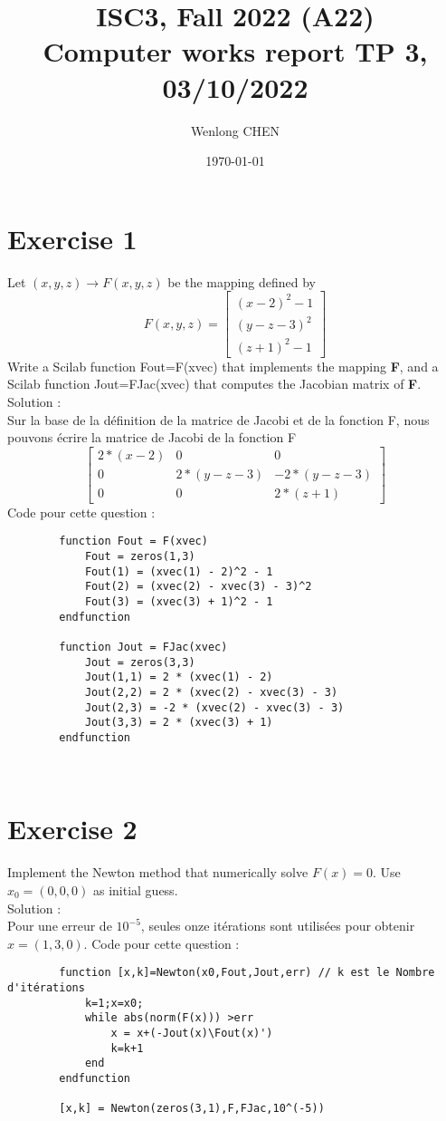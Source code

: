\documentclass[11pt]{article}
\title{ISC3, Fall 2022 (A22) \\
 Computer works report TP 3, 03/10/2022}
\author{Wenlong CHEN}
\date{\today}
\begin{document}
    \maketitle
    \section*{Exercise 1}
    Let $(x,y,z) \rightarrow F(x,y,z)$ be the mapping defined by
    $$
    F(x,y,z)=
    \begin{bmatrix}
        (x-2)^2-1 \\
        (y-z-3)^2 \\
        (z+1)^2-1
    \end{bmatrix}
    $$
    Write a Scilab function Fout=F(xvec) that implements the mapping \textbf{F}, and a Scilab function Jout=FJac(xvec) that computes the Jacobian matrix of \textbf{F}.\\
    Solution : \\
    Sur la base de la définition de la matrice de Jacobi et de la fonction F, nous pouvons écrire la matrice de Jacobi de la fonction F
    $$
    \begin{bmatrix}
        2*(x-2) & 0 & 0 \\
        0 & 2*(y-z-3) & -2*(y-z-3) \\
        0 & 0 & 2*(z+1)
    \end{bmatrix}
    $$
    Code pour cette question : 
    \begin{verbatim}
        function Fout = F(xvec)
            Fout = zeros(1,3)
            Fout(1) = (xvec(1) - 2)^2 - 1
            Fout(2) = (xvec(2) - xvec(3) - 3)^2
            Fout(3) = (xvec(3) + 1)^2 - 1
        endfunction

        function Jout = FJac(xvec)
            Jout = zeros(3,3)
            Jout(1,1) = 2 * (xvec(1) - 2)
            Jout(2,2) = 2 * (xvec(2) - xvec(3) - 3)
            Jout(2,3) = -2 * (xvec(2) - xvec(3) - 3)
            Jout(3,3) = 2 * (xvec(3) + 1)
        endfunction
    \end{verbatim}
    ~\\

    \section*{Exercise 2}
    Implement the Newton method that numerically solve $F(x) = 0$. Use $x_0 =(0,0,0)$ as initial guess.\\
    Solution : \\
    Pour une erreur de $10^{-5}$, seules onze itérations sont utilisées pour obtenir $x=(1,3,0)$.
    Code pour cette question :
    \begin{verbatim}
        function [x,k]=Newton(x0,Fout,Jout,err) // k est le Nombre d'itérations
            k=1;x=x0;
            while abs(norm(F(x))) >err
                x = x+(-Jout(x)\Fout(x)')
                k=k+1
            end
        endfunction

        [x,k] = Newton(zeros(3,1),F,FJac,10^(-5))
    \end{verbatim}
    ~\\
\end{document}
